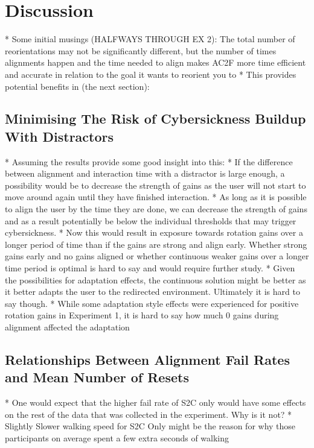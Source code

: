 \section{Discussion}

* Some initial musings (HALFWAYS THROUGH EX 2): The total number of reorientations may not be significantly different, but the number of times alignments happen and the time needed to align makes AC2F more time efficient and accurate in relation to the goal it wants to reorient you to
* This provides potential benefits in (the next section): 

\subsection{Minimising The Risk of Cybersickness Buildup With Distractors}
* Assuming the results provide some good insight into this:
* If the difference between alignment and interaction time with a distractor is large enough, a possibility would be to decrease the strength of gains as the user will not start to move around again until they have finished interaction. 
* As long as it is possible to align the user by the time they are done, we can decrease the strength of gains and as a result potentially be below the individual thresholds that may trigger cybersickness. 
   * Now this would result in exposure towards rotation gains over a longer period of time than if the gains are strong and align early. Whether strong gains early and no gains aligned or whether continuous weaker gains over a longer time period is optimal is hard to say and would require further study.
   * Given the possibilities for adaptation effects, the continuous solution might be better as it better adapts the user to the redirected environment. Ultimately it is hard to say though. 
   * While some adaptation style effects were experienced for positive rotation gains in Experiment 1, it is hard to say how much 0 gains during alignment affected the adaptation
 
\subsection{Relationships Between Alignment Fail Rates and Mean Number of Resets}

* One would expect that the higher fail rate of S2C only would have some effects on the rest of the data that was collected in the experiment. Why is it not?
   * Slightly Slower walking speed for S2C Only might be the reason for why those participants on average spent a few extra seconds of walking
   
